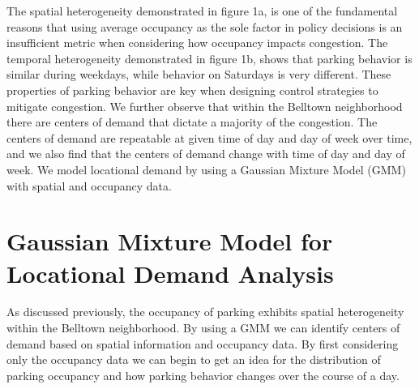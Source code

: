\documentclass{article}
\begin{document}
\noindent
The spatial heterogeneity demonstrated in figure 1a, is one of the fundamental reasons that using average occupancy as the sole factor in policy decisions is an insufficient metric when considering how occupancy impacts congestion. The temporal heterogeneity demonstrated in figure 1b, shows that parking behavior is similar during weekdays, while behavior on Saturdays is very different. These properties of parking behavior are key when designing control strategies to mitigate congestion. We further observe that within the Belltown neighborhood there are centers of demand that dictate a majority of the congestion. The centers of demand are repeatable at given time of day and day of week over time, and we also find that the centers of demand change with time of day and day of week. We model locational demand by using a Gaussian Mixture Model (GMM) with spatial and occupancy data.

\section{Gaussian Mixture Model for Locational Demand Analysis}
As discussed previously, the occupancy of parking exhibits spatial heterogeneity within the Belltown neighborhood. By using a GMM we can identify centers of demand based on spatial information and occupancy data. By first considering only the occupancy data we can begin to get an idea for the distribution of parking occupancy and how parking behavior changes over the course of a day.
\end{document}
